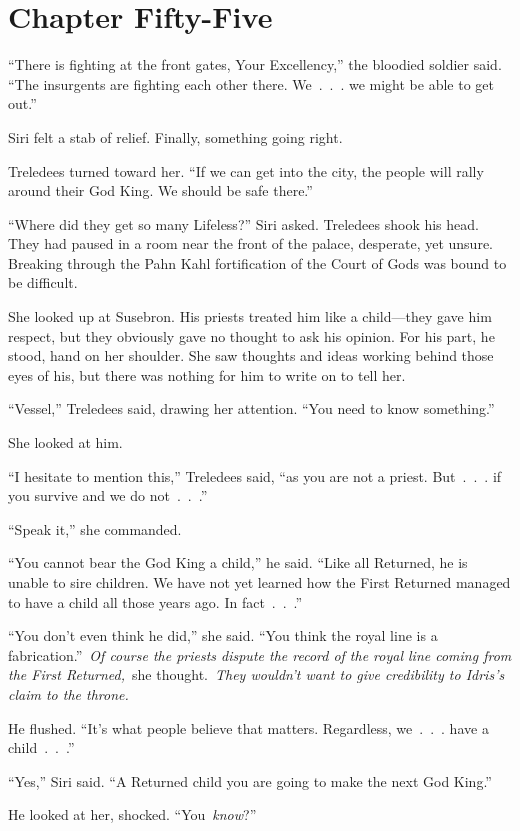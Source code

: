 \section{Chapter Fifty-Five}

“There is fighting at the front gates, Your Excellency,” the bloodied soldier said. “The insurgents are fighting each other there. We~.~.~. we might be able to get out.”

Siri felt a stab of relief. Finally, something going right.

Treledees turned toward her. “If we can get into the city, the people will rally around their God King. We should be safe there.”

“Where did they get so many Lifeless?” Siri asked. Treledees shook his head. They had paused in a room near the front of the palace, desperate, yet unsure. Breaking through the Pahn Kahl fortification of the Court of Gods was bound to be difficult.

She looked up at Susebron. His priests treated him like a child—they gave him respect, but they obviously gave no thought to ask his opinion. For his part, he stood, hand on her shoulder. She saw thoughts and ideas working behind those eyes of his, but there was nothing for him to write on to tell her.

“Vessel,” Treledees said, drawing her attention. “You need to know something.”

She looked at him.

“I hesitate to mention this,” Treledees said, “as you are not a priest. But~.~.~. if you survive and we do not~.~.~.”

“Speak it,” she commanded.

“You cannot bear the God King a child,” he said. “Like all Returned, he is unable to sire children. We have not yet learned how the First Returned managed to have a child all those years ago. In fact~.~.~.”

“You don’t even think he did,” she said. “You think the royal line is a fabrication.”~\textit{Of course the priests dispute the record of the royal line coming from the First Returned,}~she thought.~\textit{They wouldn’t want to give credibility to Idris’s claim to the throne.}

He flushed. “It’s what people believe that matters. Regardless, we~.~.~. have a child~.~.~.”

“Yes,” Siri said. “A Returned child you are going to make the next God King.”

He looked at her, shocked. “You~\textit{know}?”

